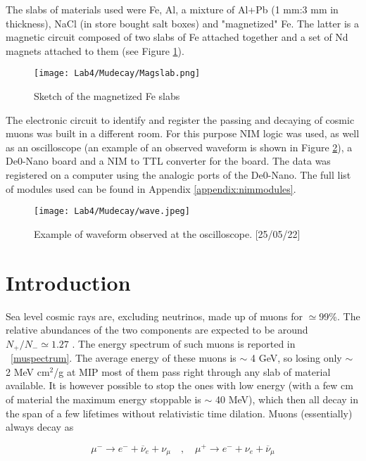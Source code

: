 \documentclass[10pt,a4paper,twocolumn]{article}
\begin{document}
The slabs of materials used were Fe, Al, a mixture of Al+Pb (1 mm:3 mm in thickness), NaCl (in store bought salt boxes) and "magnetized" Fe. The latter is a magnetic circuit composed of two slabs of Fe attached together and a set of Nd magnets attached to them (see Figure \ref{magnetizedFe}).

\begin{figure}[h!]
\centering
\texttt{[image: Lab4/Mudecay/Magslab.png]} 
\caption{Sketch of the magnetized Fe slabs}
\label{magnetizedFe}
\end{figure}

\noindent The electronic circuit to identify and register the passing and decaying of cosmic muons was built in a different room. For this purpose NIM logic was used, as well as an oscilloscope (an example of an observed waveform is shown in Figure \ref{WAVE}), a De0-Nano board and a NIM to TTL converter for the board. The data was registered on a computer using the analogic ports of the De0-Nano. The full list of modules used can be found in Appendix \ref{appendix:nimmodules}.

\begin{figure}[h!]
\centering
\texttt{[image: Lab4/Mudecay/wave.jpeg]} 
\caption{Example of waveform observed at the oscilloscope. [25/05/22]}
\label{WAVE}
\end{figure}

\section{Introduction}

Sea level cosmic rays are, excluding neutrinos, made up of muons for $\simeq$99\%. The relative abundances of the two components are expected to be around $N_+/N_- \simeq 1.27$ \cite{CMSarticle}. The energy spectrum of such muons is reported in \figurename~\ref{muspectrum}. The average energy of these muons is $\sim$ 4 GeV, so losing only $\sim$ 2 MeV  cm$^2$/g at MIP most of them pass right through any slab of material available. It is however possible to stop the ones with low energy (with a few cm of material the maximum energy stoppable is $\sim$ 40 MeV), which then all decay in the span of a few lifetimes without relativistic time dilation. Muons (essentially) always decay as

\begin{equation}
    \mu^- \rightarrow e^- + \overline{\nu}_e+ \nu_{\mu} \quad , \quad \mu^+ \rightarrow e^- + \nu_e+ \overline{\nu}_{\mu} 
\end{equation}
\end{document}

